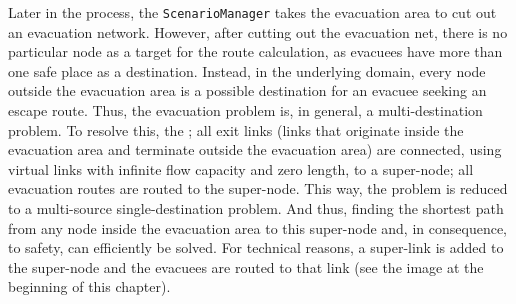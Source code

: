 Later in the process, the \lstinline|ScenarioManager| takes the evacuation area to cut out an evacuation network. However, after cutting out the evacuation net, there is no particular node as a target for the route calculation, as evacuees have more than one safe place as a destination. Instead, in the underlying domain, every node outside the evacuation area is a possible destination for an evacuee seeking an escape route. Thus, the evacuation problem is, in general, a multi-destination problem. To resolve this, the ; all exit links (\ie links that originate inside the evacuation area and terminate outside the evacuation area) are connected, using virtual links with infinite flow capacity and zero length, to a super-node; all evacuation routes are routed to the super-node. This way, the problem is reduced to a multi-source single-destination problem. And thus, finding the shortest path from any node inside the evacuation area to this super-node and, in consequence, to safety, can efficiently be solved. For technical reasons, a super-link is added to the super-node and the evacuees are routed to that link (see the image at the beginning of this chapter).

